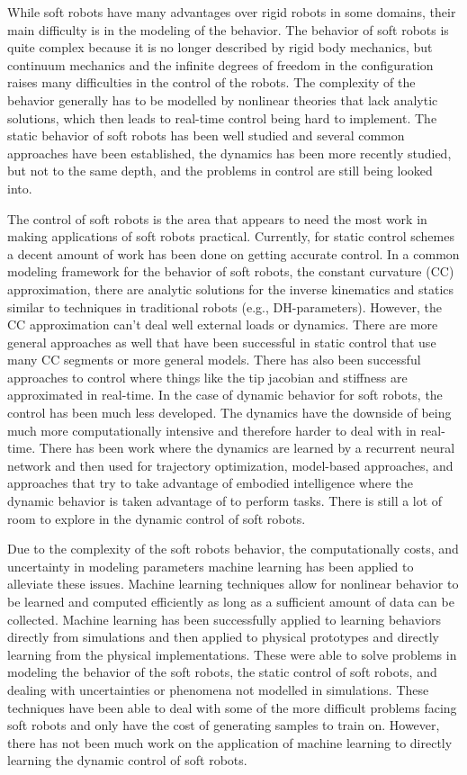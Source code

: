 \documentclass[letterpaper, 10 pt, conference]{ieeeconf}  %
\begin{document}
While soft robots have many advantages over rigid robots in some domains, their main difficulty is in the modeling of the behavior. The behavior of soft robots is quite complex because it is no longer described by rigid body mechanics, but continuum mechanics and the infinite degrees of freedom in the configuration raises many difficulties in the control of the robots. The complexity of the behavior generally has to be modelled by nonlinear theories that lack analytic solutions, which then leads to real-time control being hard to implement. The static behavior of soft robots has been well studied and several common approaches have been established, the dynamics has been more recently studied, but not to the same depth, and the problems in control are still being looked into.

The control of soft robots is the area that appears to need the most work in making applications of soft robots practical. Currently, for static control schemes a decent amount of work has been done on getting accurate control. In a common modeling framework for the behavior of soft robots, the constant curvature (CC) approximation, there are analytic solutions for the inverse kinematics and statics similar to techniques in traditional robots (e.g., DH-parameters). However, the CC approximation can't deal well external loads or dynamics. There are more general approaches as well that have been successful in static control that use many CC segments or more general models. There has also been successful approaches to control where things like the tip jacobian and stiffness are approximated in real-time. In the case of dynamic behavior for soft robots, the control has been much less developed. The dynamics have the downside of being much more computationally intensive and therefore harder to deal with in real-time. There has been work where the dynamics are learned by a recurrent neural network and then used for trajectory optimization, model-based approaches, and approaches that try to take advantage of embodied intelligence where the dynamic behavior is taken advantage of to perform tasks. There is still a lot of room to explore in the dynamic control of soft robots. 

Due to the complexity of the soft robots behavior, the computationally costs, and uncertainty in modeling parameters machine learning has been applied to alleviate these issues. Machine learning techniques allow for nonlinear behavior to be learned and computed efficiently as long as a sufficient amount of data can be collected. Machine learning has been successfully applied to learning behaviors directly from simulations and then applied to physical prototypes and directly learning from the physical implementations. These were able to solve problems in modeling the behavior of the soft robots, the static control of soft robots, and dealing with uncertainties or phenomena not modelled in simulations. These techniques have been able to deal with some of the more difficult problems facing soft robots and only have the cost of generating samples to train on. However, there has not been much work on the application of machine learning to directly learning the dynamic control of soft robots.
\end{document}
